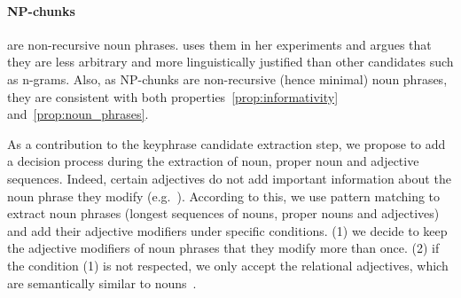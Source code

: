   \paragraph{NP-chunks} are non-recursive noun phrases.
   uses them in her experiments and argues
  that they are less arbitrary and more linguistically justified than other
  candidates such as n-grams. Also, as NP-chunks are non-recursive (hence
  minimal) noun phrases, they are consistent with both
  properties~\ref{prop:informativity} and~\ref{prop:noun_phrases}.


  As a contribution to the keyphrase candidate extraction step, we propose to
  add a decision process during the extraction of noun, proper noun and
  adjective sequences. Indeed, certain adjectives do not add important
  information about the noun phrase they modify (e.g.~). According
  to this, we use pattern matching to extract noun phrases (longest sequences of
  nouns, proper nouns and adjectives) and add their adjective modifiers under
  specific conditions. (1) we decide to keep the adjective modifiers of noun
  phrases that they modify more than once. (2) if the condition (1) is not
  respected, we only accept the relational adjectives, which are semantically
  similar to nouns~\cite{bally1944linguistiquegeneraleetlinguistiquefrancaise}.


